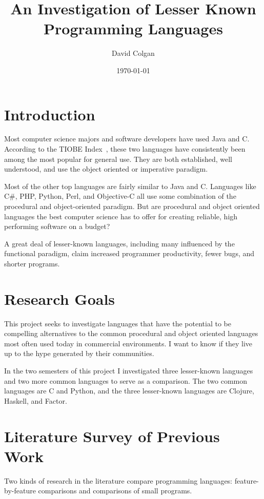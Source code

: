 \documentclass{article}
\title{An Investigation of Lesser Known Programming Languages}
\author{David Colgan}
\date{\today}
\begin{document}
\maketitle

\section{Introduction}

Most computer science majors and software developers have used Java and C.
According to the TIOBE Index~\cite{tiobe}, these two languages have
consistently been among the most popular for general use.  They are both
established, well understood, and use the object oriented or imperative
paradigm.

Most of the other top languages are fairly similar to Java and C.  Languages
like C\#, PHP, Python, Perl, and Objective-C all use some combination of the
procedural and object-oriented paradigm.   But are procedural and object
oriented languages the best computer science has to offer for creating
reliable, high performing software on a budget?

A great deal of lesser-known languages, including many influenced by the
functional paradigm, claim increased programmer productivity, fewer bugs, and
shorter programs.

\section{Research Goals}

This project seeks to investigate languages that have the potential to be
compelling alternatives to the common procedural and object oriented languages
most often used today in commercial environments.  I want to know if they live
up to the hype generated by their communities.

In the two semesters of this project I investigated three lesser-known languages
and two more common languages to serve as a comparison.  The two common
languages are C and Python, and the three lesser-known languages are Clojure,
Haskell, and Factor.  

\section{Literature Survey of Previous Work}
\label{sec:survey}

Two kinds of research in the literature compare programming languages:
feature-by-feature comparisons and comparisons of small programs.
\end{document}
